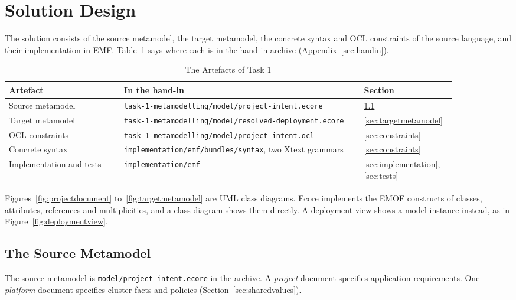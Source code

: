 \section{Solution Design}
\label{sec:design}

The solution consists of the source metamodel, the target metamodel, the
concrete syntax and OCL constraints of the source language, and their
implementation in EMF. Table~\ref{tab:artefacts} says where each is in the
hand-in archive (Appendix~\ref{sec:handin}).

\begin{table}[!htbp]
\centering
\small
\begin{tabular}{>{\raggedright\arraybackslash}p{0.24\linewidth}>{\raggedright\arraybackslash}p{0.50\linewidth}>{\raggedright\arraybackslash}p{0.14\linewidth}}
\hline
\textbf{Artefact} & \textbf{In the hand-in} & \textbf{Section} \\
\hline
Source metamodel & \texttt{task-1-metamodelling/}\allowbreak\texttt{model/project-intent.ecore} & \ref{sec:sourcemetamodel} \\
Target metamodel & \texttt{task-1-metamodelling/}\allowbreak\texttt{model/resolved-deployment.ecore} & \ref{sec:targetmetamodel} \\
OCL constraints & \texttt{task-1-metamodelling/}\allowbreak\texttt{model/project-intent.ocl} & \ref{sec:constraints} \\
Concrete syntax & \texttt{implementation/emf/}\allowbreak\texttt{bundles/syntax}, two Xtext grammars & \ref{sec:constraints} \\
Implementation and tests & \texttt{implementation/emf} & \ref{sec:implementation}, \ref{sec:tests} \\
\hline
\end{tabular}
\caption{The Artefacts of Task 1}
\label{tab:artefacts}
\end{table}

Figures~\ref{fig:projectdocument} to~\ref{fig:targetmetamodel} are UML class
diagrams. Ecore implements the EMOF constructs of classes, attributes,
references and multiplicities, and a class diagram shows them directly. A
deployment view shows a model instance instead, as in
Figure~\ref{fig:deploymentview}.

\subsection{The Source Metamodel}
\label{sec:sourcemetamodel}

The source metamodel is \texttt{model/project-intent.ecore} in the archive. A
\emph{project} document specifies application requirements. One \emph{platform}
document specifies cluster facts and policies (Section~\ref{sec:sharedvalues}).

